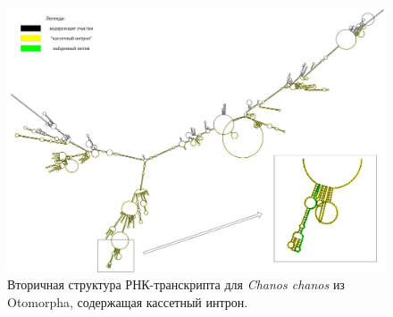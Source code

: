 


\newpage
\begin{figure}[h] %
    \centering
    \includegraphics[width=1.0\textwidth]{images/Chanos_chanos_2nd_structure}
    \caption{Вторичная структура РНК-транскрипта для \textit{Chanos chanos} из Otomorpha, содержащая кассетный интрон.}
    \label{fig:Chanos_chanos_2nd_structure}
\end{figure}
